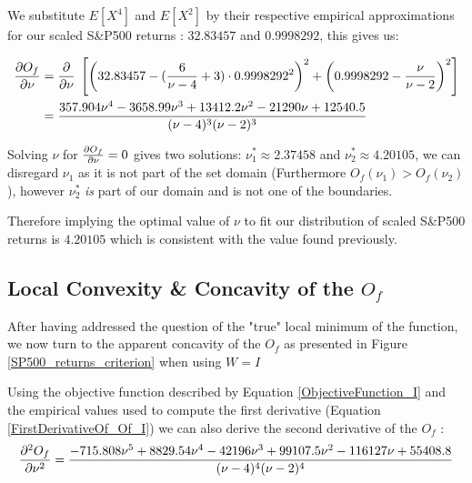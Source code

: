 We substitute $E\left[X^4\right]$ and $E\left[X^2\right]$ by their respective empirical approximations for our scaled S\&P500 returns : $32.83457$ and $0.9998292$, this gives us:

\begin{align}\label{FirstDerivativeOf_Of_I}
    \begin{split}
        \pdv{O_f}{\nu} &= \pdv{\nu} \; \left[ \left(32.83457 - (\frac{6}{\nu-4} + 3) \cdot
                            0.9998292^2 \right)^2 + \left(0.9998292 - \frac{\nu}{\nu - 2}\right)^2 \right] \\
                        &= \frac{357.904 \nu^4 - 3658.99 \nu^3 + 13412.2 \nu^2 - 21290 \nu + 12540.5}{(\nu - 4)^3 (\nu - 2)^3}
    \end{split}
\end{align}


Solving $\nu$ for  $\pdv{O_f}{\nu}=0$ gives two solutions: $\nu_1^* \approx 2.37458$ and $\nu_2^* \approx 4.20105$, we can disregard $\nu_1$ as it is not part of the set domain (Furthermore $O_f(\nu_1) > O_f(\nu_2)$), however $\nu_2^*$ \emph{is} part of our domain and is not one of the boundaries. \smallskip
\par
Therefore implying the optimal value of $\nu$ to fit our distribution of scaled S\&P500 returns is $4.20105$ which is consistent with the value found previously.

\subsection{Local Convexity \& Concavity of the $O_f$}

After having addressed the question of the "true" local minimum of the function, we now turn to the apparent concavity of the $O_f$ as presented in Figure \ref{SP500_returns_criterion} when using $W=I$ \bigskip\par
Using the objective function described by Equation \ref{ObjectiveFunction_I} and the empirical values used to compute the first derivative (Equation \ref{FirstDerivativeOf_Of_I}) we can also derive the second derivative of the $O_f$ :
\begin{equation}\label{SecondDerivativeOf_Of_I}
    \pdv[2]{O_f}{\nu} =  \frac{-715.808 \nu^5 + 8829.54 \nu^4 - 42196 \nu^3 + 99107.5 \nu^2 - 116127 \nu + 55408.8}{(\nu - 4)^4 (\nu - 2)^4}
\end{equation}

